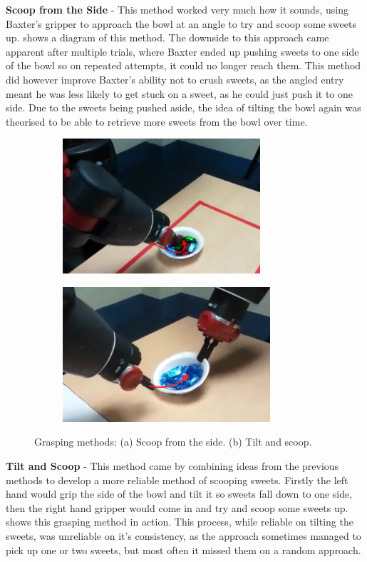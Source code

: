 \newline\newline
\textbf{Scoop from the Side} - This method worked very much how it sounds, using Baxter's gripper to approach the bowl at an angle to try and scoop some sweets up. \textbf{} shows a diagram of this method. The downside to this approach came apparent after multiple trials, where Baxter ended up pushing sweets to one side of the bowl so on repeated attempts, it could no longer reach them. This method did however improve Baxter's ability not to crush sweets, as the angled entry meant he was less likely to get stuck on a sweet, as he could just push it to one side. Due to the sweets being pushed aside, the idea of tilting the bowl again was theorised to be able to retrieve more sweets from the bowl over time.
\begin{figure}[H]
    \begin{subfigure}[b]{0.475\textwidth}   
        \centering 
        \caption{}
        \label{fig:scoopfromside}
        \includegraphics[width=\textwidth, height=5cm]{scoopfromside.png}
    \end{subfigure}
    \quad
    \begin{subfigure}[b]{0.475\textwidth}   
        \centering 
        \caption{}
        \label{fig:tiltandshake}
        \includegraphics[width=\textwidth, height=5cm]{tiltandshake.png}
    \end{subfigure}
    \caption{Grasping methods: (a) Scoop from the side. (b) Tilt and scoop.}
\end{figure}
\textbf{Tilt and Scoop} - This method came by combining ideas from the previous methods to develop a more reliable method of scooping sweets. Firstly the left hand would grip the side of the bowl and tilt it so sweets fall down to one side, then the right hand gripper would come in and try and scoop some sweets up. \textbf{} shows this grasping method in action. This process, while reliable on tilting the sweets, was unreliable on it's consistency, as the approach sometimes managed to pick up one or two sweets, but most often it missed them on a random approach.
